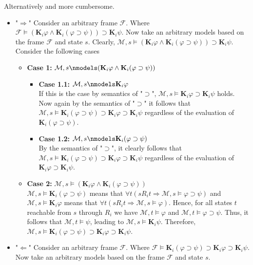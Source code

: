 \documentclass[11pt,a4paper]{article}
\newcommand{\lto}{\supset}
\newcommand{\eall}{\mathbf{K}}
\newcommand{\sto}{\Rightarrow}
\begin{document}
Alternatively and more cumbersome.
\begin{itemize}
\item "$\Longrightarrow$"
Consider an arbitrary frame $\mathcal{F}$. Where $\mathcal{F} \models (\eall_i \varphi \land \eall_i (\varphi \lto \psi)) \lto \eall_i \psi$. Now take an arbitrary models based on the frame $\mathcal{F}$ and state $s$.
Clearly, $\mathcal{M},s \models (\eall_i \varphi \land \eall_i (\varphi \lto \psi)) \lto \eall_i \psi$. Consider the following cases
\begin{itemize}
\item \textbf{Case 1:} $\mathcal{M}, s\nmodels (\eall_i \varphi \land \eall_i (\varphi \lto \psi))$
\begin{itemize}
\item \textbf{Case 1.1:} $\mathcal{M}, s\nmodels \eall_i \varphi $\\
If this is the case by semantics of "$\lto$", $\mathcal{M}, s\models \eall_i \varphi \lto \eall_i \psi$ holds. Now again by the semantics of "$\lto$" it follows that $\mathcal{M}, s\models \eall_i(\varphi \lto \psi) \lto  \eall_i \varphi \lto \eall_i \psi$ regardless of the evaluation of $\eall_i(\varphi \lto \psi)$.
\item \textbf{Case 1.2:} $\mathcal{M}, s\nmodels \eall_i (\varphi \lto \psi) $\\
By the semantics of "$\lto$", it clearly follows that $\mathcal{M}, s\models \eall_i(\varphi \lto \psi) \lto  \eall_i \varphi \lto \eall_i \psi$ regardless of the evaluation of $\eall_i \varphi \lto \eall_i \psi$.
\end{itemize}
\item  \textbf{Case 2:} $\mathcal{M}, s\models (\eall_i \varphi \land \eall_i (\varphi \lto \psi))$\\
$\mathcal{M}, s \models \eall_i (\varphi \lto \psi)$ means that $\forall t (sR_i t \sto \mathcal{M},s \models \varphi \lto \psi )$ and $\mathcal{M}, s \models \eall_i \varphi$ means that $\forall t (sR_i t \sto \mathcal{M},s \models \varphi )$. Hence, for all states $t$ reachable from $s$ through $R_i$ we have $\mathcal{M}, t \models \varphi$ and $\mathcal{M}, t \models \varphi \lto \psi$. Thus, it follows that $\mathcal{M}, t \models \psi$, leading to $\mathcal{M}, s\models \eall_i \psi$. Therefore, $\mathcal{M}, s\models \eall_i(\varphi \lto \psi) \lto  \eall_i \varphi \lto \eall_i \psi$.
\end{itemize}
\item "$\Longleftarrow$"
Consider an arbitrary frame $\mathcal{F}$. Where $\mathcal{F} \models \eall_i(\varphi \lto \psi) \lto  \eall_i \varphi \lto \eall_i \psi$. Now take an arbitrary models based on the frame $\mathcal{F}$ and state $s$.

\end{itemize}
\end{document}

